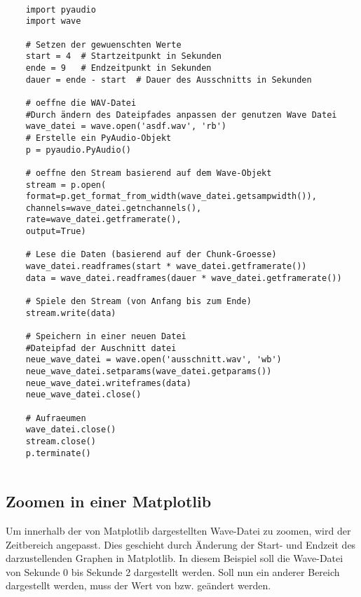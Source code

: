 \begin{verbatim}
    
    import pyaudio
    import wave
    
    # Setzen der gewuenschten Werte
    start = 4  # Startzeitpunkt in Sekunden
    ende = 9   # Endzeitpunkt in Sekunden
    dauer = ende - start  # Dauer des Ausschnitts in Sekunden
    
    # oeffne die WAV-Datei
    #Durch ändern des Dateipfades anpassen der genutzen Wave Datei
    wave_datei = wave.open('asdf.wav', 'rb') 
    # Erstelle ein PyAudio-Objekt
    p = pyaudio.PyAudio()
    
    # oeffne den Stream basierend auf dem Wave-Objekt
    stream = p.open(
    format=p.get_format_from_width(wave_datei.getsampwidth()),
    channels=wave_datei.getnchannels(),
    rate=wave_datei.getframerate(),
    output=True)
    
    # Lese die Daten (basierend auf der Chunk-Groesse)
    wave_datei.readframes(start * wave_datei.getframerate())
    data = wave_datei.readframes(dauer * wave_datei.getframerate())
    
    # Spiele den Stream (von Anfang bis zum Ende)
    stream.write(data)
    
    # Speichern in einer neuen Datei
    #Dateipfad der Auschnitt datei
    neue_wave_datei = wave.open('ausschnitt.wav', 'wb')
    neue_wave_datei.setparams(wave_datei.getparams())
    neue_wave_datei.writeframes(data)
    neue_wave_datei.close()
    
    # Aufraeumen
    wave_datei.close()
    stream.close()
    p.terminate()
    
\end{verbatim}

\subsection{Zoomen in einer Matplotlib}

Um innerhalb der von Matplotlib dargestellten Wave-Datei zu zoomen, wird der Zeitbereich angepasst. Dies geschieht durch Änderung der Start- und Endzeit des darzustellenden Graphen in Matplotlib. In diesem Beispiel soll die Wave-Datei von Sekunde 0 bis Sekunde 2 dargestellt werden. Soll nun ein anderer Bereich dargestellt werden, muss der Wert von  bzw.  geändert werden.

